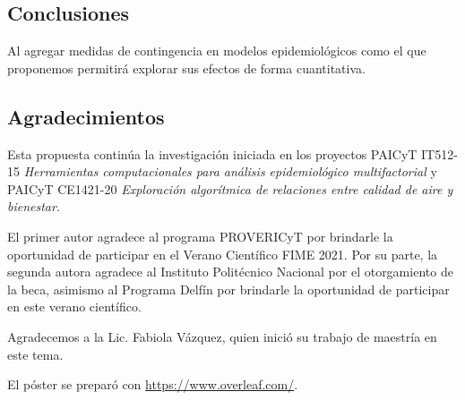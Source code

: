 \documentclass[a4]{sciposter}
\begin{document}
\begin{multicols}{2}
\section{Conclusiones}

Al agregar medidas de contingencia en modelos epidemiológicos como el que proponemos permitirá explorar sus efectos de forma cuantitativa.

\subsection*{Agradecimientos}

{\small Esta propuesta continúa la investigación iniciada en los proyectos PAICyT IT512-15 \emph{Herramientas computacionales para análisis epidemiológico multifactorial} y PAICyT CE1421-20 \emph{Exploración algorítmica de relaciones entre calidad de aire y bienestar}.
    
    El primer autor agradece al programa PROVERICyT por brindarle la oportunidad de participar en el Verano Científico FIME 2021.
    Por su parte, la segunda autora agradece al Instituto Politécnico Nacional por el otorgamiento de la beca, asimismo al Programa Delfín por brindarle la oportunidad de participar en este verano científico.

    Agradecemos a la Lic. Fabiola Vázquez, quien inició su trabajo de maestría en este tema.
    
    El póster se preparó con \url{https://www.overleaf.com/}.}

\end{multicols} 



\end{document}
